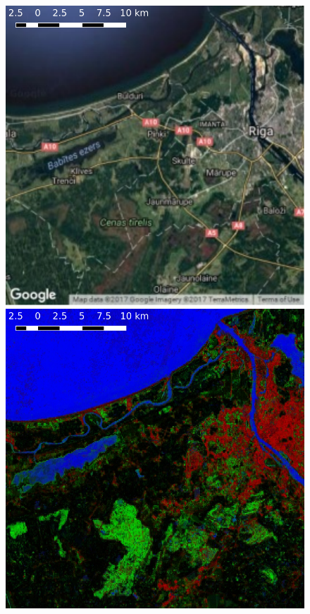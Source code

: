 \documentclass[20pt]{beamer}
\begin{document}
\begin{frame}{}
\begin{textblock}{7}
		\begin{figure}
		  \includegraphics[width=2.3\TPHorizModule]{../thesis/thesis-figures/figures-qgis/riga-google}
		  \includegraphics[width=2.3\TPHorizModule]{../thesis/thesis-figures/figures-qgis/riga-rf}

\end{figure}
\end{textblock}
\end{frame}
\end{document}
